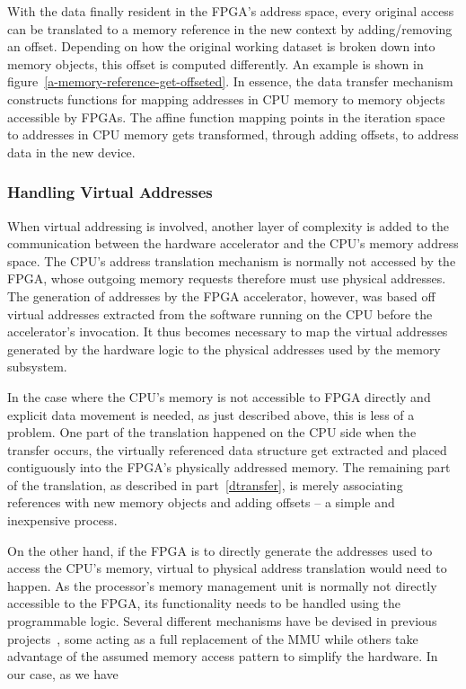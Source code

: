 With the data finally resident in the FPGA's address space, every original access can be translated to a memory reference in the new context by adding/removing an offset. Depending on how the original working
dataset is broken down into memory objects, this offset is computed differently. An example is shown in  figure~\ref{a-memory-reference-get-offseted}. 
In essence, the data transfer mechanism constructs functions for mapping addresses in CPU memory to memory objects accessible by FPGAs. 
The affine function mapping points in the iteration space to addresses in CPU memory gets transformed, through adding offsets, to address data
in the new device. 



\subsubsection{Handling Virtual Addresses}
When virtual addressing is involved, another layer of complexity is added to the communication between the hardware accelerator and the CPU's memory address space. The CPU's address translation mechanism is normally not accessed by the FPGA, whose outgoing memory requests therefore must use
physical addresses. The generation of addresses by the FPGA accelerator, however, was based off virtual addresses extracted from the software running on the CPU before the accelerator's invocation. It thus becomes necessary to map the virtual addresses generated by the hardware logic to the physical addresses used by the memory subsystem.

In the case where the CPU's memory is not accessible to FPGA
directly and explicit data movement is needed, as just described above, this is less of a problem. One part of the translation happened on the CPU side when the transfer occurs, the virtually referenced data structure get extracted and placed contiguously into the FPGA's physically addressed memory. The remaining part of the translation, as described in part~\ref{dtransfer}, is merely associating references with new memory objects and adding offsets -- a simple and inexpensive process.

On the other hand, if the FPGA is to directly generate the addresses used to access the CPU's memory, virtual to physical address translation would need to happen. As the processor's memory management unit is normally not directly accessible to the FPGA, its functionality needs to be handled using the programmable logic. Several different mechanisms have be devised in
previous projects~\cite{6718414}\cite{7459405}\cite{4042434}, some acting
as a full replacement of the MMU while others take advantage of the assumed
memory access pattern to simplify the hardware. In our case, as we have

